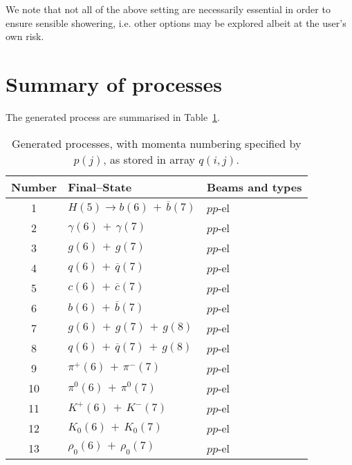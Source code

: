\documentclass[12pt]{article}
\begin{document}
We note that not all of the above setting are necessarily essential in order to ensure sensible showering, i.e. other options may be explored albeit at the user's own risk.

\section{Summary of processes}\label{sec:proc}

The generated process are summarised in Table~\ref{table:proc}.
\newpage
\begin{center}
\begin{table}[htbp!]\tiny
\renewcommand\arraystretch{1.0}
\caption{Generated processes, with momenta numbering specified by $p(j)$, as stored in array $q(i,j)$.}
\label{table:proc}
\begin{tabular}{|c|l|l|}\hline
Number&Final--State& Beams and types\\\hline\hline

1 &  $H(5) \to b(6)\,+\,\overline{b}(7)$ &  $pp$-el  \\

2 &  $\gamma(6)\,+\, \gamma(7)$ &  $pp$-el  \\

3 & $g(6)\,+\, g(7)$ &  $pp$-el  \\

4 & $q(6)\,+\, \overline{q}(7)$ &  $pp$-el  \\

5 & $c(6)\,+\, \overline{c}(7)$ &  $pp$-el  \\

6 & $b(6)\,+\, \overline{b}(7)$ &  $pp$-el  \\

7 & $g(6)\,+\, g(7)\,+\, g(8)$ &  $pp$-el  \\

8 & $q(6)\,+\, \overline{q}(7)\,+\, g(8)$ &  $pp$-el  \\

9 & $\pi^+(6)\,+\,\pi^-(7)$ &  $pp$-el  \\

10 & $ \pi^0(6)\,+\,\pi^0(7)$ &  $pp$-el  \\

11 & $K^+(6)\,+\,K^-(7)$ &  $pp$-el  \\

12 & $K_0(6)\,+\,K_0(7)$ &  $pp$-el  \\

13 & $\rho_0(6)\,+\,\rho_0(7)$ &  $pp$-el  \\


\end{tabular}
\end{table}
\end{center}
\end{document}
